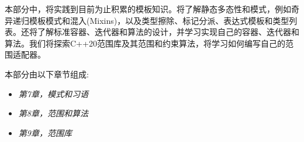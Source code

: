 本部分中，将实践到目前为止积累的模板知识。将了解静态多态性和模式，例如奇异递归模板模式和混入(Mixins)，以及类型擦除、标记分派、表达式模板和类型列表。还将了解标准容器、迭代器和算法的设计，并学习实现自己的容器、迭代器和算法。我们将探索C++20范围库及其范围和约束算法，将学习如何编写自己的范围适配器。

本部分由以下章节组成:

\begin{itemize}
\item
\textit{第7章，模式和习语}

\item
\textit{第8章，范围和算法}

\item
\textit{第9章，范围库}
\end{itemize}